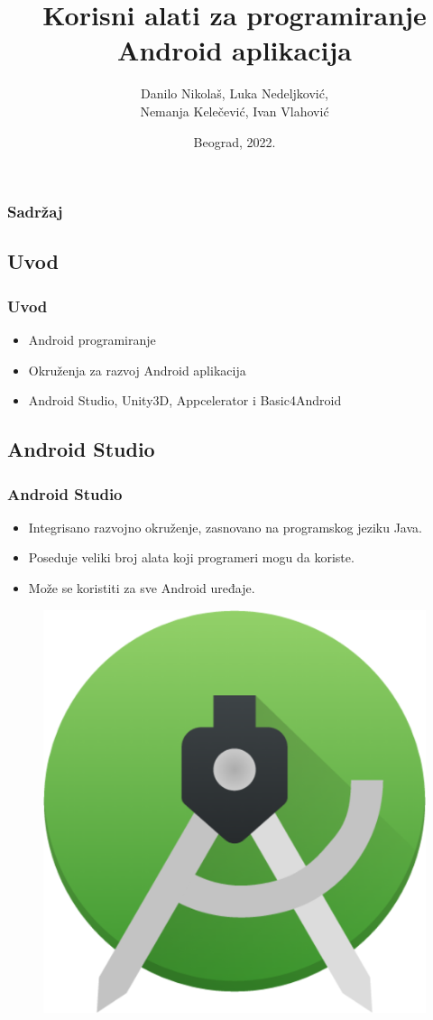 \documentclass{beamer}
\title{Korisni alati za programiranje Android aplikacija}
\author{Danilo Nikolaš, Luka Nedeljković,\\ Nemanja Kelečević, Ivan Vlahović}
\institute[]{Matematički fakultet, Univerzitet u Beogradu}
\date{
	\footnotesize{Beograd, 2022.}	
}
\begin{document}
\begin{frame}
	\titlepage
\end{frame}


\begin{frame}
	\frametitle{Sadržaj}
	\tableofcontents[hidesubsections] 
\end{frame}

\begin{frame}
    \section{Uvod}
    \frametitle{Uvod} 
    \begin{itemize}
	\item Android programiranje
	\item Okruženja za razvoj Android aplikacija
	\item Android Studio, Unity3D, Appcelerator i Basic4Android
   \end{itemize}
\end{frame}

\begin{frame}
    \section{Android Studio}
    \frametitle{Android Studio} 
    \begin{itemize}
	\item Integrisano razvojno okruženje, zasnovano na programskog jeziku Java.
	\item Poseduje veliki broj alata koji programeri mogu da koriste.
	\item  Može se koristiti za sve Android uređaje.
   \end{itemize}
   \begin{figure}[ht!]
    \centering
    \includegraphics[scale=0.10]{android_studio_logo.png}
\end{figure}
\end{frame}
\end{document}
